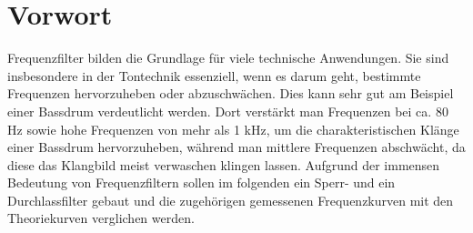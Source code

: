 \section{Vorwort}
Frequenzfilter bilden die Grundlage für viele technische Anwendungen. Sie sind insbesondere in der Tontechnik essenziell, wenn es darum geht, bestimmte Frequenzen hervorzuheben oder abzuschwächen. Dies kann sehr gut am Beispiel einer Bassdrum verdeutlicht werden. Dort verstärkt man Frequenzen bei ca. 80 Hz sowie hohe Frequenzen von mehr als 1 kHz, um die charakteristischen Klänge einer Bassdrum hervorzuheben, während man mittlere Frequenzen abschwächt, da diese das Klangbild meist verwaschen klingen lassen. Aufgrund der immensen Bedeutung von Frequenzfiltern sollen im folgenden ein Sperr- und ein Durchlassfilter gebaut und die zugehörigen gemessenen Frequenzkurven mit den Theoriekurven verglichen werden.
